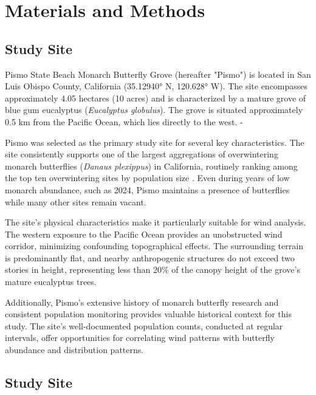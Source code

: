 \section{Materials and Methods}
\subsection{Study Site}
Pismo State Beach Monarch Butterfly Grove (hereafter "Pismo") is located in San Luis Obispo County, California (35.12940° N, 120.628° W). The site encompasses approximately 4.05 hectares (10 acres) and is characterized by a mature grove of blue gum eucalyptus (\textit{Eucalyptus globulus}). The grove is situated approximately 0.5 km from the Pacific Ocean, which lies directly to the west.
-

Pismo was selected as the primary study site for several key characteristics. The site consistently supports one of the largest aggregations of overwintering monarch butterflies (\textit{Danaus plexippus}) in California, routinely ranking among the top ten overwintering sites by population size \autocite{westernmonarchcount2023}. Even during years of low monarch abundance, such as 2024, Pismo maintains a presence of butterflies while many other sites remain vacant.

The site's physical characteristics make it particularly suitable for wind analysis. The western exposure to the Pacific Ocean provides an unobstructed wind corridor, minimizing confounding topographical effects. The surrounding terrain is predominantly flat, and nearby anthropogenic structures do not exceed two stories in height, representing less than 20\% of the canopy height of the grove's mature eucalyptus trees.

Additionally, Pismo's extensive history of monarch butterfly research and consistent population monitoring provides valuable historical context for this study. The site's well-documented population counts, conducted at regular intervals, offer opportunities for correlating wind patterns with butterfly abundance and distribution patterns.

\subsection{Study Site}
